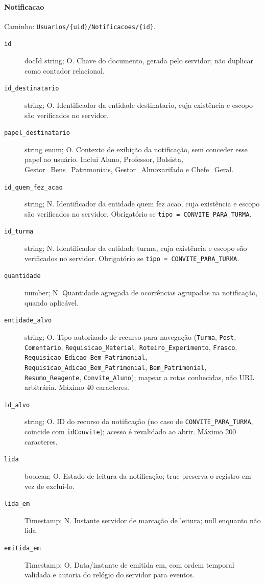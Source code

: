 \paragraph{Notificacao}\mbox{}\par
Caminho: \texttt{Usuarios/\{uid\}/Notificacoes/\{id\}}.
\begin{description}
\item[\texttt{id}] docId string; O. Chave do documento, gerada pelo servidor; não duplicar como contador relacional.
\item[\texttt{id\_destinatario}] string; O. Identificador da entidade destinatario, cuja existência e escopo são verificados no servidor.
\item[\texttt{papel\_destinatario}] string enum; O. Contexto de exibição da notificação, sem conceder esse papel ao usuário. Inclui Aluno, Professor, Bolsista, Gestor\_Bens\_Patrimoniais, Gestor\_Almoxarifado e Chefe\_Geral.
\item[\texttt{id\_quem\_fez\_acao}] string; N. Identificador da entidade quem fez acao, cuja existência e escopo são verificados no servidor. Obrigatório se \texttt{tipo = CONVITE\_PARA\_TURMA}.
\item[\texttt{id\_turma}] string; N. Identificador da entidade turma, cuja existência e escopo são verificados no servidor. Obrigatório se \texttt{tipo = CONVITE\_PARA\_TURMA}.
\item[\texttt{quantidade}] number; N. Quantidade agregada de ocorrências agrupadas na notificação, quando aplicável.
\item[\texttt{entidade\_alvo}] string; O. Tipo autorizado de recurso para navegação (\texttt{Turma}, \texttt{Post}, \texttt{Comentario}, \texttt{Requisicao\_Material}, \texttt{Roteiro\_Experimento}, \texttt{Frasco}, \texttt{Requisicao\_Edicao\_Bem\_Patrimonial}, \texttt{Requisicao\_Adicao\_Bem\_Patrimonial}, \texttt{Bem\_Patrimonial}, \texttt{Resumo\_Reagente}, \texttt{Convite\_Aluno}); mapear a rotas conhecidas, não URL arbitrária. Máximo 40 caracteres.
\item[\texttt{id\_alvo}] string; O. ID do recurso da notificação (no caso de \texttt{CONVITE\_PARA\_TURMA}, coincide com \texttt{idConvite}); acesso é revalidado ao abrir. Máximo 200 caracteres.
\item[\texttt{lida}] boolean; O. Estado de leitura da notificação; true preserva o registro em vez de excluí-lo.
\item[\texttt{lida\_em}] Timestamp; N. Instante servidor de marcação de leitura; null enquanto não lida.
\item[\texttt{emitida\_em}] Timestamp; O. Data/instante de emitida em, com ordem temporal validada e autoria do relógio do servidor para eventos.

\end{description}
